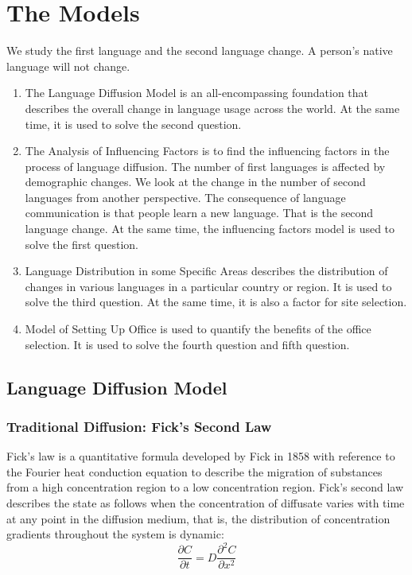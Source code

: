 \documentclass{mcmthesis}
\begin{document}
  \section{The Models}
  We study the first language and the second language change.
  A person's native language will not change.
  \begin{enumerate}
  \item The Language Diffusion Model is an all-encompassing foundation that describes the overall change in language usage across the world.
  At the same time, it is used to solve the second question.

  \item The Analysis of Influencing Factors is to find the influencing factors in the process of language diffusion.
  The number of first languages is affected by demographic changes.
  We look at the change in the number of second languages from another perspective.
  The consequence of language communication is that people learn a new language.
  That is the second language change.
  At the same time, the influencing factors model is used to solve the first question.

  \item Language Distribution in some Specific Areas describes the distribution of changes in various languages in a particular country or region.
  It is used to solve the third question.
  At the same time, it is also a factor for site selection.

  \item Model of Setting Up Office is used to quantify the benefits of the office selection.
  It is used to solve the fourth question and fifth question.
  \end{enumerate}

    \subsection{Language Diffusion Model}%
    \subsubsection{Traditional Diffusion: Fick's Second Law}%

    Fick's law is a quantitative formula developed by Fick in 1858
    with reference to the Fourier heat conduction equation
    to describe the migration of substances
    from a high concentration region to a low concentration region.
    Fick's second law describes the state as follows
    when the concentration of diffusate varies with time at any point in the diffusion medium,
    that is, the distribution of concentration gradients throughout the system is dynamic:
    $$\frac{\partial C}{\partial t}=D\frac{\partial^2C}{\partial x^2}$$
\end{document}
